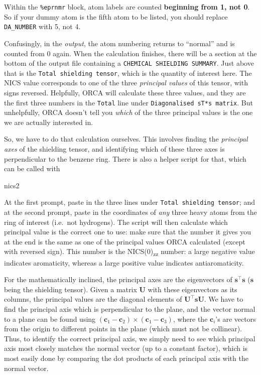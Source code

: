 \documentclass[10pt]{article}
\begin{document}
\begin{warning}
Within the \texttt{\%eprnmr} block, atom labels are counted \textbf{beginning from 1, not 0}. So if your dummy atom is the fifth atom to be listed, you should replace \texttt{DA\_NUMBER} with 5, not 4.
\end{warning}

Confusingly, in the \textit{output}, the atom numbering returns to ``normal'' and is counted from 0 again. When the calculation finishes, there will be a section at the bottom of the output file containing a \texttt{CHEMICAL SHIELDING SUMMARY}. Just above that is the \texttt{Total shielding tensor}, which is the quantity of interest here. The NICS value corresponds to one of the three \textit{principal values} of this tensor, with signs reversed. Helpfully, ORCA will calculate these three values, and they are the first three numbers in the \texttt{Total} line under \texttt{Diagonalised sT*s matrix}. But unhelpfully, ORCA doesn't tell you \textit{which} of the three principal values is the one we are actually interested in.

So, we have to do that calculation ourselves. This involves finding the \textit{principal axes} of the shielding tensor, and identifying which of these three axes is perpendicular to the benzene ring. There is also a helper script for that, which can be called with

\begin{cmdline}
nics2
\end{cmdline}

At the first prompt, paste in the three lines under \texttt{Total shielding tensor}; and at the second prompt, paste in the coordinates of \textit{any} three heavy atoms from the ring of interest (i.e.\ not hydrogens). The script will then calculate which principal value is the correct one to use: make sure that the number it gives you at the end is the same as one of the principal values ORCA calculated (except with reversed sign). This number is the NICS(0)\textsubscript{zz} number: a large negative value indicates aromaticity, whereas a large positive value indicates antiaromaticity.

For the mathematically inclined, the principal axes are the eigenvectors of \(\mathbf{s}^\intercal \mathbf{s}\) (\(\mathbf{s}\) being the shielding tensor). Given a matrix \(\mathbf{U}\) with these eigenvectors as its columns, the principal values are the diagonal elements of \(\mathbf{U^\intercal \mathbf{s} \mathbf{U}}\). We have to find the principal axis which is perpendicular to the plane, and the vector normal to a plane can be found using \((\mathbf{c}_1 - \mathbf{c}_2) \times (\mathbf{c}_1 - \mathbf{c}_3)\), where the \(\mathbf{c}_i\)'s are vectors from the origin to different points in the plane (which must not be collinear). Thus, to identify the correct principal axis, we simply need to see which principal axis most closely matches the normal vector (up to a constant factor), which is most easily done by comparing the dot products of each principal axis with the normal vector.

\printbibliography
\end{document}
